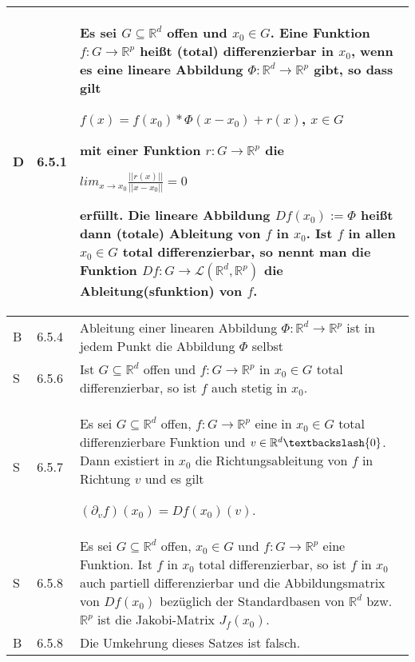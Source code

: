     \begin{longtable}{p{0.75cm} p{1cm} p{16cm}}
        \toprule

        D   & 6.5.1 &   Es sei $G \subseteq \mathbb{R}^d$ offen und $x_0 \in G$. Eine Funktion $f: G \rightarrow \mathbb{R}^p$ heißt
                        \textbf{(total) differenzierbar} in $x_0$, wenn es eine lineare Abbildung $\Phi: \mathbb{R}^d \rightarrow \mathbb{R}^p$
                        gibt, so dass gilt \hfill \break
                        \centerline{$ f(x) = f(x_0) * \Phi(x-x_0) + r(x)$, $x \in G$}
                        mit einer Funktion $r: G \rightarrow \mathbb{R}^p$ die \hfill \break
                        \centerline{$ lim_{x \rightarrow x_0} \frac{||r(x)||}{||x-x_0||} = 0 $}
                        erfüllt. \hfill \break
                        Die lineare Abbildung $Df(x_0) := \Phi$ heißt dann \textbf{(totale) Ableitung} von $f$ in $x_0$. Ist $f$ in allen
                        $x_0 \in G$ total differenzierbar, so nennt man die Funktion $Df: G \rightarrow \mathcal{L}(\mathbb{R}^d, \mathbb{R}^p)$
                        die \textbf{Ableitung(sfunktion)} von $f$. \\
        \midrule
        B   & 6.5.4 &   Ableitung einer linearen Abbildung $\Phi: \mathbb{R}^d \rightarrow \mathbb{R}^p$ ist in jedem Punkt die Abbildung $\Phi$ selbst \\
        \midrule
        S   & 6.5.6 &   Ist $G \subseteq \mathbb{R}^d$ offen und $f: G\rightarrow \mathbb{R}^p$ in $x_0 \in G$ total differenzierbar, so ist $f$ auch
                        stetig in $x_0$. \\
        \midrule
        S   & 6.5.7 &   Es sei $G \subseteq \mathbb{R}^d$ offen, $f: G \rightarrow \mathbb{R}^p$ eine in $x_0 \in G$ total differenzierbare Funktion und
                        $v \in \mathbb{R}^d \textbackslash \{0\}$. Dann existiert in $x_0$ die Richtungsableitung von $f$ in Richtung $v$ und es gilt \hfill \break
                        \centerline{$ (\partial_vf)(x_0) = Df(x_0)(v)$.} \\
        \midrule
        S   & 6.5.8 &   Es sei $G \subseteq \mathbb{R}^d$ offen, $x_0 \in G$ und $f: G \rightarrow \mathbb{R}^p$ eine Funktion. Ist $f$ in $x_0$ total
                        differenzierbar, so ist $f$ in $x_0$ auch partiell differenzierbar und die Abbildungsmatrix von $Df(x_0)$ bezüglich der Standardbasen
                        von $\mathbb{R}^d$ bzw. $\mathbb{R}^p$ ist die Jakobi-Matrix $J_f(x_0)$. \\
        \midrule
        B   & 6.5.8 &   Die Umkehrung dieses Satzes ist falsch. \\

\end{longtable}
